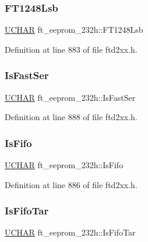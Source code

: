 \subsubsection{\texorpdfstring{F\+T1248\+Lsb}{FT1248Lsb}}
{\footnotesize\ttfamily \hyperlink{CatCaloProto40MHz_2inc_2WinTypes_8h_a4f4bb67531a9bf6f0b9c6ad76aeba587}{U\+C\+H\+AR} ft\+\_\+eeprom\+\_\+232h\+::\+F\+T1248\+Lsb}



Definition at line 883 of file ftd2xx.\+h.

\mbox{\label{structft__eeprom__232h_ad214d1fe4bf5bf916c5364777f9dc1a8}} 
\subsubsection{\texorpdfstring{Is\+Fast\+Ser}{IsFastSer}}
{\footnotesize\ttfamily \hyperlink{CatCaloProto40MHz_2inc_2WinTypes_8h_a4f4bb67531a9bf6f0b9c6ad76aeba587}{U\+C\+H\+AR} ft\+\_\+eeprom\+\_\+232h\+::\+Is\+Fast\+Ser}



Definition at line 888 of file ftd2xx.\+h.

\mbox{\label{structft__eeprom__232h_a5b6fa725478fe8f58ef4aa232ff4f6c4}} 
\subsubsection{\texorpdfstring{Is\+Fifo}{IsFifo}}
{\footnotesize\ttfamily \hyperlink{CatCaloProto40MHz_2inc_2WinTypes_8h_a4f4bb67531a9bf6f0b9c6ad76aeba587}{U\+C\+H\+AR} ft\+\_\+eeprom\+\_\+232h\+::\+Is\+Fifo}



Definition at line 886 of file ftd2xx.\+h.

\mbox{\label{structft__eeprom__232h_a73d9b80c5b4c07b2085deeb4689b4371}} 
\subsubsection{\texorpdfstring{Is\+Fifo\+Tar}{IsFifoTar}}
{\footnotesize\ttfamily \hyperlink{CatCaloProto40MHz_2inc_2WinTypes_8h_a4f4bb67531a9bf6f0b9c6ad76aeba587}{U\+C\+H\+AR} ft\+\_\+eeprom\+\_\+232h\+::\+Is\+Fifo\+Tar}



